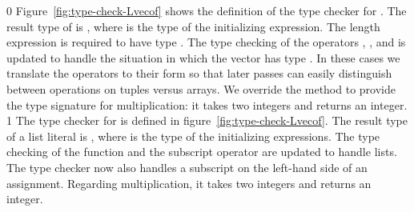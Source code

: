 \documentclass[7x10]{TimesAPriori_MIT}%
\def\racketEd{0}
\def\pythonEd{1}
\def\edition{1}
\newcommand{\pythonColor}[0]{}
\numberwithin{theorem}{chapter}
\numberwithin{definition}{chapter}
\numberwithin{equation}{chapter}
\begin{document}
{\if\edition\racketEd
%
Figure~\ref{fig:type-check-Lvecof} shows the definition of the type
checker for \LangArray{}. The result type of
 is , where  is the type
of the initializing expression.  The length expression is required to
have type . The type checking of the operators
, , and   is
updated to handle the situation in which the vector has type
. In these cases we translate the operators to their
 form so that later passes can easily distinguish
between operations on tuples versus arrays. We override the
 method to provide the type signature for
multiplication: it takes two integers and returns an integer.  \fi}
{\if\edition\pythonEd\pythonColor
%
The type checker for \LangArray{} is defined in
figure~\ref{fig:type-check-Lvecof}. The result type of a list literal
is , where  is the type of the initializing
expressions.  The type checking of the  function and the
subscript operator are updated to handle lists. The type checker now
also handles a subscript on the left-hand side of an assignment.
Regarding multiplication, it takes two integers and returns an
integer.
%
\fi}
\end{document}
